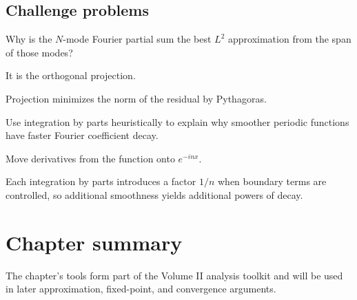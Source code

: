 \subsection*{Challenge problems}

\begin{exercise}\label{exr:ii14-expand-15}
Why is the \(N\)-mode Fourier partial sum the best \(L^2\) approximation from the span of those modes?
\end{exercise}
\begin{hint}
It is the orthogonal projection.
\end{hint}
\begin{solution}
Projection minimizes the norm of the residual by Pythagoras.
\end{solution}

\begin{exercise}\label{exr:ii14-expand-16}
Use integration by parts heuristically to explain why smoother periodic functions have faster Fourier coefficient decay.
\end{exercise}
\begin{hint}
Move derivatives from the function onto \(e^{-inx}\).
\end{hint}
\begin{solution}
Each integration by parts introduces a factor \(1/n\) when boundary terms are controlled, so additional smoothness yields additional powers of decay.
\end{solution}
\section*{Chapter summary}
The chapter's tools form part of the Volume II analysis toolkit and will be used in later approximation, fixed-point, and convergence arguments.
